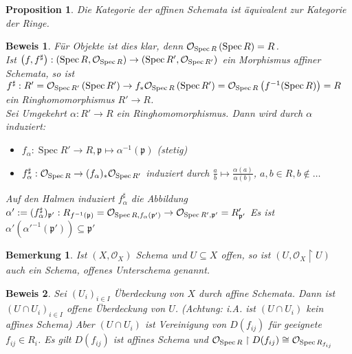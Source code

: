 \documentclass[a4paper,oneside]{scrbook}
\theoremstyle{break}
\newtheorem{Bem}[Def]{Bemerkung}
\newtheorem{Prop}[Def]{Proposition}
\theoremstyle{nonumberbreak}
\theoremstyle{nonumberplain}
\newtheorem{Bew}{Beweis}
\theoremstyle{break}
\newcommand{\Spec}{%
	\ensuremath{\operatorname{Spec}}%
}
\begin{document}
\begin{Prop}
\label{prop:3.3}
 Die Kategorie der affinen Schemata ist äquivalent zur Kategorie der Ringe.
\end{Prop}
\begin{Bew}
	Für Objekte ist dies klar, denn $\mathcal{O}_{\Spec R}\left(\Spec R\right) = R$. \\
	Ist $\left( f, f^\sharp \right): \left( \Spec R,\mathcal{O}_{\Spec R} \right)  \rightarrow \left( \Spec R',\mathcal{O}_{\Spec R'} \right)$ ein Morphismus affiner Schemata, so ist $f^\sharp: R' =\mathcal{O}_{\Spec R'}\left(\Spec R'\right) \rightarrow  f_* \mathcal{O}_{\Spec R}\left(\Spec R'\right)=\mathcal{O}_{\Spec R}\left(f^{-1} (\Spec R)\right) = R$ ein Ringhomomorphismus $R' \rightarrow R$. \\
	Sei Umgekehrt $\alpha : R' \rightarrow R$ ein Ringhomomorphismus. Dann wird durch $\alpha$ induziert: 
	\begin{itemize}
		\item $f_\alpha : \Spec R' \rightarrow R, \mathfrak{p} \mapsto \alpha^{-1}(\mathfrak{p})$  (stetig)
		\item $f_\alpha^\sharp: \mathcal{O}_{\Spec R} \rightarrow (f_\alpha)_* \mathcal{O}_{\Spec R'}$ induziert durch $\frac{a}{b} \mapsto \frac{\alpha(a)}{\alpha(b)}$, $a,b \in R, b \notin \dots$ 
	\end{itemize}
	Auf den Halmen induziert $f_\alpha^\sharp$ die Abbildung $\alpha':= (f_\alpha^\sharp)_{\mathfrak{p}'}: R_{f^{-1}(\mathfrak{p})} = \mathcal{O}_{\Spec R, f_\alpha(\mathfrak{p}')} \rightarrow  \mathcal{O}_{\Spec R', \mathfrak{p}'}= R'_{\mathfrak{p}'}$
	Es ist $\alpha' (\alpha'^{-1} (\mathfrak{p}') ) \subseteq \mathfrak{p}'$
\end{Bew}

\begin{Bem}
	Ist $\left( X, \mathcal{O}_X \right)$ Schema und $U \subseteq X$ offen, so ist $\left( U, \mathcal{O}_X \restriction U \right)$ auch ein Schema, offenes Unterschema genannt.
\end{Bem}
\begin{Bew}
 Sei $(U_i)_{i \in I}$ Überdeckung von $X$ durch affine Schemata. Dann ist $(U \cap U_i)_{i \in I}$ offene Überdeckung von $U$. (Achtung: i.A. ist $(U \cap U_i)$ kein affines Schema) Aber $(U \cap U_i)$ ist Vereinigung von $D(f_{ij})$ für geeignete $f_{ij} \in R_i$. Es gilt $D(f_{ij})$ ist affines Schema und $\mathcal{O}_{\Spec R} \restriction D(f_{ij}) \cong \mathcal{O}_{\Spec R_{f_{ij}}}$
\end{Bew}
\end{document}
